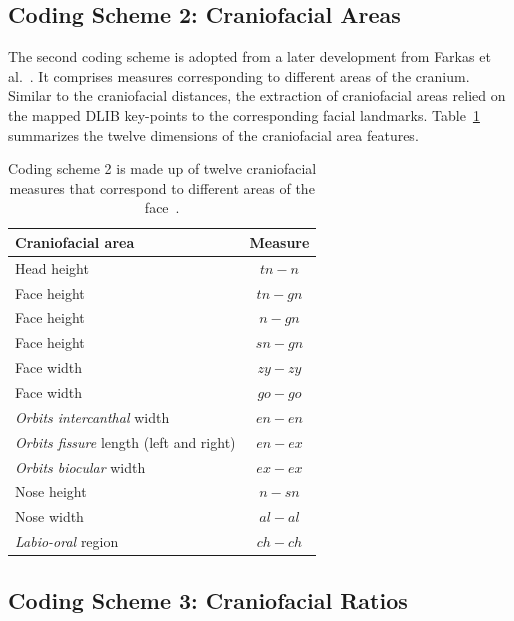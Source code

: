 \documentclass[letterpaper,11pt]{article}
\begin{document}

\subsection{Coding Scheme 2: Craniofacial Areas} \label{sec:cf2}

 The second coding scheme is adopted from a later development from Farkas et al.~\cite{anthropmetry05}.  It comprises measures corresponding to different areas of the cranium.  Similar to the craniofacial distances, the extraction of craniofacial areas relied on the mapped DLIB key-points to the corresponding facial landmarks.  Table~\ref{tab:cranio2} summarizes the twelve dimensions of the craniofacial area features. 
 
\begin{table}[ht]
\centering
\begin{tabular}{|l|c|}
    \hline 
 \bf  Craniofacial area    & \bf Measure\\\hline\hline
    Head height& $tn-n$   \\ \hline 
    Face height & $tn-gn$  \\ \hline
    Face height& $n-gn$  \\ \hline
    Face height& $sn-gn$ \\ \hline
    Face width& $zy-zy$ \\ \hline
    Face  width& $go-go$ \\ \hline
    {\it Orbits intercanthal} width & $en-en$ \\ \hline
    {\it Orbits fissure} length (left and right)& $en-ex$  \\ \hline
    {\it Orbits biocular} width& $ex-ex$ \\ \hline
    Nose height& $n-sn$ \\ \hline
    Nose width& $al-al$ \\ \hline
    {\it Labio-oral} region & $ch-ch$ \\ \hline
    \end{tabular}
    \vspace{-0.1cm}
    \caption{Coding scheme 2 is made up of twelve craniofacial measures that correspond to different areas of the face~\cite{anthropmetry05}.}
    \label{tab:cranio2}
\end{table}


\subsection{Coding Scheme 3: Craniofacial Ratios} \label{sec:cf3}
\end{document}
